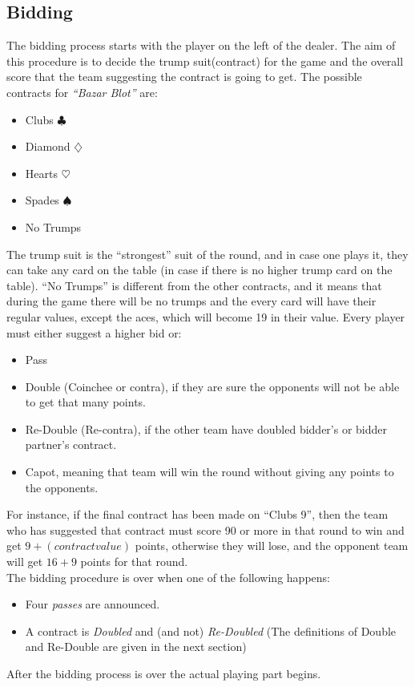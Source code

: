 \subsection{Bidding}
The bidding process starts with the player on the left of the dealer.
The aim of this procedure is to decide the trump suit(contract) for the game and the overall score that the team suggesting the contract is going to get.
The possible contracts for \textit{``Bazar Blot''} are:
\begin{itemize}
    \item Clubs $\clubsuit$
    \item Diamond $\diamondsuit$
    \item Hearts $\heartsuit$
    \item Spades $\spadesuit$
    \item No Trumps
\end{itemize}
The trump suit is the ``strongest'' suit of the round, and in case one plays it, they can take any card on the table (in case if there is no higher trump card on the table).
``No Trumps'' is different from the other contracts, and it means that during the game there will be no trumps and the every card will have their regular values, except the aces, which will become 19 in their value.
Every player must either suggest a higher bid or:
\begin{itemize}
    \item Pass
    \item Double (Coinchee or contra), if they are sure the opponents will not be able to get that many points.
    \item Re-Double (Re-contra), if the other team have doubled bidder's or bidder partner's contract.
    \item Capot, meaning that team will win the round without giving any points to the opponents.
\end{itemize}
For instance, if the final contract has been made on ``Clubs 9'', then the team who has suggested that contract must score 90 or more in that round to win and get $9+(contract value)$ points, otherwise they will lose, and the opponent team will get $16+9$ points for that round.\\
The bidding procedure is over when one of the following happens:
\begin{itemize}
    \item Four \textit{passes} are announced.
    \item A contract is \textit{Doubled} and (and not) \textit{Re-Doubled} (The definitions of Double and Re-Double are given in the next section)
\end{itemize}
After the bidding process is over the actual playing part begins.

